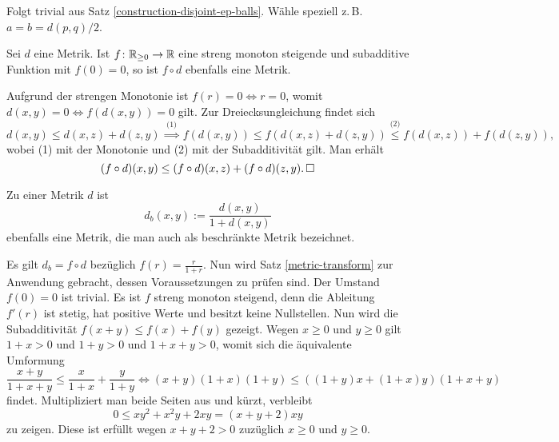 \begin{Beweis}
Folgt trivial aus Satz \ref{construction-disjoint-ep-balls}.
Wähle speziell z.\,B. $a=b=d(p,q)/2$.\,\qedsymbol
\end{Beweis}

\begin{Satz}\label{metric-transform}
Sei $d$ eine Metrik. Ist $f\colon\mathbb R_{\ge 0}\to\mathbb R$ eine streng monoton
steigende und subadditive Funktion mit $f(0)=0$, so ist $f\circ d$
ebenfalls eine Metrik.
\end{Satz}
\begin{Beweis}
Aufgrund der strengen Monotonie ist $f(r)=0\Leftrightarrow r = 0$,
womit $d(x,y)=0\Leftrightarrow f(d(x,y))=0$ gilt. Zur
Dreiecksungleichung findet sich
\[d(x,y) \le d(x,z) + d(z,y)
\stackrel{\text{(1)}}\implies f(d(x,y))\le f(d(x,z) + d(z,y))
\stackrel{\text{(2)}}\le f(d(x,z)) + f(d(z,y)),\]
wobei (1) mit der Monotonie und (2) mit der Subadditivität
gilt. Man erhält
\[(f\circ d)(x,y)\le (f\circ d)(x,z) + (f\circ d)(z,y).\,\square\]
\end{Beweis}

\begin{Satz}
Zu einer Metrik $d$ ist
\[d_b(x,y) := \frac{d(x,y)}{1+d(x,y)}\]
ebenfalls eine Metrik, die man auch als beschränkte Metrik bezeichnet.
\end{Satz}
\begin{Beweis}
Es gilt $d_b = f\circ d$ bezüglich $f(r) = \frac{r}{1+r}$.
Nun wird Satz \ref{metric-transform} zur Anwendung gebracht, dessen
Voraussetzungen zu prüfen sind. Der Umstand
$f(0)=0$ ist trivial. Es ist $f$ streng monoton steigend, denn
die Ableitung $f'(r)$ ist stetig, hat positive Werte und besitzt keine
Nullstellen. Nun wird die Subadditivität $f(x+y)\le f(x)+f(y)$ gezeigt.
Wegen $x\ge 0$ und $y\ge 0$ gilt $1+x>0$ und $1+y>0$ und
$1+x+y>0$, womit sich die äquivalente Umformung
\[\frac{x+y}{1+x+y} \le \frac{x}{1+x} + \frac{y}{1+y}
\Leftrightarrow (x+y)(1+x)(1+y) \le ((1+y)x + (1+x)y)(1+x+y)\]
findet. Multipliziert man beide Seiten aus und kürzt, verbleibt
\[0\le xy^2 + x^2 y + 2xy = (x+y+2)xy\]
zu zeigen. Diese ist erfüllt wegen $x+y+2>0$ zuzüglich $x\ge 0$ und
$y\ge 0$.\,\qedsymbol
\end{Beweis}

\newpage
